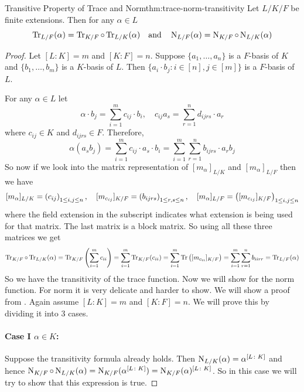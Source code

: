 \begin{Theorem}{Transitive Property of Trace and Norm}{thm:trace-norm-transitivity}
  Let $L/K/F$ be finite extensions. Then for any $\alpha\in L$ $$\operatorname{Tr}_{L/F}(\alpha)=\operatorname{Tr}_{K/F}\circ \operatorname{Tr}_{L/K}(\alpha)\quad\text{and}\quad \operatorname{N}_{L/F}(\alpha)=
    \operatorname{N}_{K/F}\circ \operatorname{N}_{L/K}(\alpha)$$
\end{Theorem}
\begin{proof}
  Let $[L\colon K]=m$ and $[K\colon F]=n$. Suppose $\{a_1,\dots, a_n\}$ is a $F$-basis of $K$ and $\{b_1,\dots, b_m\}$ is a $K$-basis of $L$. Then $\{a_i\cdot b_j\colon i\in[n],j\in[m]\}$ is a $F$-basis of $L$.

  For any $\alpha\in L$ let\begin{equation}
    \alpha\cdot b_j=\sum_{i=1}^m c_{ij}\cdot b_i,\quad c_{ij}a_s=\sum_{r=1}^nd_{ijrs}\cdot a_r
  \end{equation}
  where $c_{ij}\in K$ and $d_{ijrs}\in F$. Therefore, $$\alpha(a_sb_j)=\sum_{i=1}^mc_{ij}\cdot a_s\cdot b_i=\sum_{i=1}^m\sum_{r=1}^n b_{ijrs}\cdot a_rb_j$$So now if we look into the matrix representation of $[m_{\alpha}]_{L/K}$ and $[m_{\alpha}]_{L/F}$ then we have $$[m_{\alpha}]_{L/K}=\left(c_{ij}\right)_{1\leq i,j\leq n},\quad [m_{c_{ij}}]_{K/F}=\left(b_{ijrs}\right)_{1\leq r,s\leq n},\quad [m_{\alpha}]_{L/F}=\left([m_{c_{ij}}]_{K/F}\right)_{1\leq i,j\leq n}$$
  where the field extension in the subscript indicates what extension is being used for that matrix. The last matrix is a block matrix. So using all these three matrices we get \begin{align*}
    \operatorname{Tr}_{K/F}\circ \operatorname{Tr}_{L/K}(\alpha)  = \operatorname{Tr}_{K/F}\left(\sum_{i=1}^m c_{ii}\right) = \sum_{i=1}^m \operatorname{Tr}_{K/F}(c_{ii}) = \sum_{i=1}^m \operatorname{Tr}\left([m_{c_{ii}}]_{K/F}\right)= \sum_{i=1}^m \sum_{r=1}^n b_{iirr}= \operatorname{Tr}_{L/F}(\alpha)
  \end{align*}
  So we have the transitivity of the trace function. Now we will show for the norm function. For norm it is very delicate and harder to show. We will show a proof from \cite{scholl2005galois}. Again assume $[L\colon K]=m$ and $[K\colon F]=n$. We will prove this by dividing it into 3 cases.

  \paragraph*{Case I $\alpha\in K$:} Suppose the transitivity formula already holds. Then $\operatorname{N}_{L/K}(\alpha)=\alpha^{[L\colon K]}$ and hence $\operatorname{N}_{K/F}\circ \operatorname{N}_{L/K}(\alpha)=\operatorname{N}_{K/F}(\alpha^{[L\colon K]})=\operatorname{N}_{K/F}(\alpha)^{[L\colon K]}$. So in this case we will try to show that this expression is true.


\end{proof}
